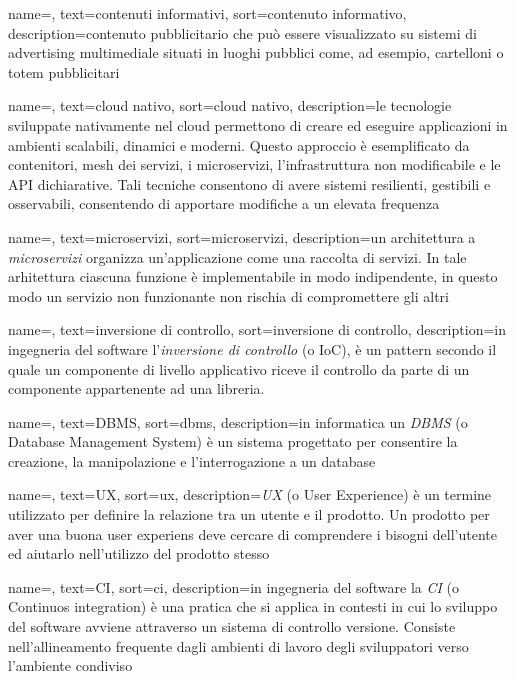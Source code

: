 {
    name=,
    text=contenuti informativi,
    sort=contenuto informativo,
    description={contenuto pubblicitario che può essere visualizzato su sistemi di advertising multimediale situati in luoghi pubblici come, ad esempio, cartelloni o totem pubblicitari}
}

{
    name=,
    text=cloud nativo,
    sort=cloud nativo,
    description={le tecnologie sviluppate nativamente nel cloud permettono di creare ed eseguire applicazioni in ambienti scalabili, dinamici e moderni. Questo approccio è esemplificato da contenitori, mesh dei servizi, i microservizi, l'infrastruttura non modificabile e le API dichiarative. Tali tecniche consentono di avere sistemi resilienti, gestibili e osservabili, consentendo di apportare modifiche a un elevata frequenza}
}

{
    name=,
    text=microservizi,
    sort=microservizi,
    description={un architettura a \emph{microservizi} organizza un'applicazione come una raccolta di servizi. In tale arhitettura ciascuna funzione è implementabile in modo indipendente, in questo modo un servizio non funzionante non rischia di compromettere gli altri}
}

{
    name=,
    text=inversione di controllo,
    sort=inversione di controllo,
    description={in ingegneria del software l'\emph{inversione di controllo} (o IoC), è un pattern secondo il quale un componente di livello applicativo riceve il controllo da parte di un componente appartenente ad una libreria.}
}

{
    name=,
    text=DBMS,
    sort=dbms,
    description={in informatica un \emph{DBMS} (o Database Management System) è un sistema progettato per consentire la creazione, la manipolazione e l'interrogazione a un database}
}

{
    name=,
    text=UX,
    sort=ux,
    description={\emph{UX} (o User Experience) è un termine utilizzato per definire la relazione tra un utente e il prodotto. Un prodotto per aver una buona user experiens deve cercare di comprendere i bisogni dell'utente ed aiutarlo nell'utilizzo del prodotto stesso}
}

{
    name=,
    text=CI,
    sort=ci,
    description={in ingegneria del software la \emph{CI} (o Continuos integration) è una pratica che si applica in contesti in cui lo sviluppo del software avviene attraverso un sistema di controllo versione. Consiste nell'allineamento frequente dagli ambienti di lavoro degli sviluppatori verso l'ambiente condiviso}
}

